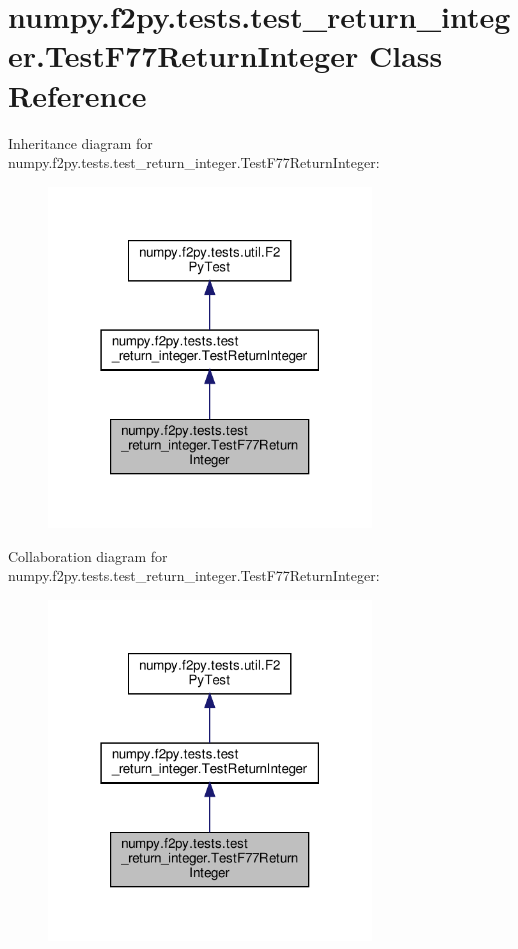 \hypertarget{classnumpy_1_1f2py_1_1tests_1_1test__return__integer_1_1TestF77ReturnInteger}{}\section{numpy.\+f2py.\+tests.\+test\+\_\+return\+\_\+integer.\+Test\+F77\+Return\+Integer Class Reference}
\label{classnumpy_1_1f2py_1_1tests_1_1test__return__integer_1_1TestF77ReturnInteger}


Inheritance diagram for numpy.\+f2py.\+tests.\+test\+\_\+return\+\_\+integer.\+Test\+F77\+Return\+Integer\+:
\nopagebreak
\begin{figure}[H]
\begin{center}
\leavevmode
\includegraphics[width=243pt]{classnumpy_1_1f2py_1_1tests_1_1test__return__integer_1_1TestF77ReturnInteger__inherit__graph}
\end{center}
\end{figure}


Collaboration diagram for numpy.\+f2py.\+tests.\+test\+\_\+return\+\_\+integer.\+Test\+F77\+Return\+Integer\+:
\nopagebreak
\begin{figure}[H]
\begin{center}
\leavevmode
\includegraphics[width=243pt]{classnumpy_1_1f2py_1_1tests_1_1test__return__integer_1_1TestF77ReturnInteger__coll__graph}
\end{center}
\end{figure}
